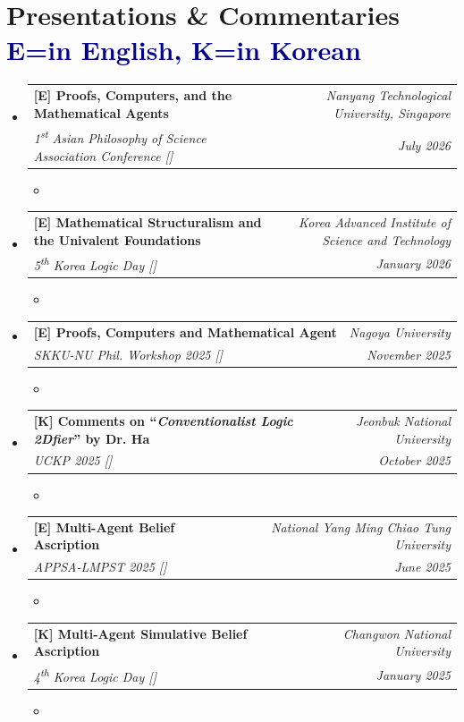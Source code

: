 \documentclass[a4paper,11pt]{article}
\makeatletter
\newcommand{\resumeSubheading}[4]{
\vspace{0.5mm}\item
    \begin{tabular*}{0.98\textwidth}[t]{l@{\extracolsep{\fill}}r}
        \textbf{#1} & \textit{\footnotesize{#4}} \\
        \textit{\footnotesize{#3}} &  \footnotesize{#2}\\
    \end{tabular*}
    \vspace{-2.4mm}
}
\newcommand{\resumeSubHeadingListStart}{\begin{itemize}[leftmargin=*,labelsep=1mm]}
\newcommand{\resumeItemListStart}{\begin{itemize}[leftmargin=*,labelsep=1mm,itemsep=0.5mm]}
\newcommand{\resumeSubHeadingListEnd}{\end{itemize}\vspace{2mm}}
\newcommand{\resumeItemListEnd}{\end{itemize}\vspace{-2mm}}
\makeatother
\begin{document}
\section{\textbf{Presentations \& Commentaries} \hfill \textcolor{darkblue}{\scriptsize E=in English, K=in Korean}}
\vspace{-0.4mm}
\resumeSubHeadingListStart
\resumeSubheading
{[E] Proofs, Computers, and the Mathematical Agents}
{\textit{July 2026}}
{1\textsuperscript{st} Asian Philosophy of Science Association Conference \textsc{[\href{https://www.philsciasia.org/apsa26/}{\textcolor{darkblue}{\faIcon{globe}}}]}}{Nanyang Technological University, Singapore}
\resumeItemListStart
\item[]
\resumeSubHeadingListEnd
\vspace{-6mm}
\resumeSubheading
{[E] Mathematical Structuralism and the Univalent Foundations}{\textit{January 2026}}
{5\textsuperscript{th} Korea Logic Day \textsc{[\href{https://korealogicday.org/2026/}{\textcolor{darkblue}{\faIcon{globe}}}]}}{Korea Advanced Institute of Science and Technology}
\resumeItemListStart
\item[]
\resumeSubHeadingListEnd
\vspace{-6mm}
\resumeSubheading
{[E] Proofs, Computers and Mathematical Agent}{\textit{November 2025}}
{SKKU-NU Phil. Workshop 2025 \textsc{[\href{https://sites.google.com/site/masashikasaki2/\%E3\%82\%A4\%E3\%83\%99\%E3\%83\%B3\%E3\%83\%88/philosophical-interchange-between-sungkyunkwan-and-nagoya-university?authuser=0/}{\textcolor{darkblue}{\faIcon{globe}}}]}}{Nagoya University}
\resumeItemListStart
\item[]
\resumeSubHeadingListEnd
\vspace{-6mm}
\resumeSubheading
{[K] Comments on ``\textit{Conventionalist Logic 2Dfier}'' by Dr. Ha}{\textit{October 2025}}
{UCKP 2025 \textsc{[\href{https://hanchul.org/board/notice/article/267452}{\textcolor{darkblue}{\faIcon{globe}}}]}}{Jeonbuk National University}
\resumeItemListStart
\item[]
\resumeSubHeadingListEnd
\vspace{-6mm}
\resumeSubheading
{[E] Multi-Agent Belief Ascription}{\textit{June 2025}}
{APPSA-LMPST 2025 \textsc{[\href{https://appsa2025taiwan.mystrikingly.com/}{\textcolor{darkblue}{\faIcon{globe}}}]}}{National Yang Ming Chiao Tung University}
\resumeItemListStart
\item[]
\resumeSubHeadingListEnd
\vspace{-6mm}
\resumeSubheading
{[K] Multi-Agent Simulative Belief Ascription}{\textit{January 2025}}
{4\textsuperscript{th} Korea Logic Day \textsc{[\href{https://korealogicday.org/2025/}{\textcolor{darkblue}{\faIcon{globe}}}]}}{Changwon National University}
\resumeItemListStart
\item[]
\resumeItemListEnd
\resumeSubHeadingListEnd
\vspace{-6mm}
\end{document}
